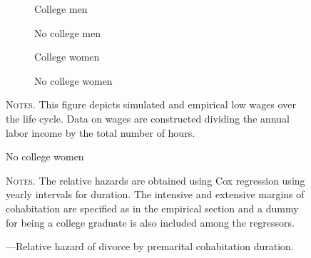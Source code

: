 \documentclass[12pt]{article}
\begin{document}
\begin{figure}[ht]
\begin{center}
\caption{---Low wages over the life cycle: simulations and data}
\label{fig:incomedata}

\begin{subfigure}{.49\textwidth}
\centering
\caption{College men}
\label{fig:em}
\scalebox{0.5}{ } 
\end{subfigure}
\begin{subfigure}{.49\textwidth}
\centering
\caption{No college men}
\label{fig:nm}
\scalebox{0.5}{ } 
\end{subfigure}
\end{center}

\hspace{20em}

\begin{center}
\begin{subfigure}{.49\textwidth}
\centering
\caption{College women}
\label{fig:ef}
\scalebox{0.5}{ } 
\end{subfigure}
\begin{subfigure}{.49\textwidth}
\centering
\caption{No college women}
\label{fig:nf}
\scalebox{0.5}{ } 
\end{subfigure}
\end{center}

\begin{minipage}{0.99\textwidth} %
{\footnotesize \textsc{Notes.} This figure depicts simulated and empirical low wages over the life cycle. Data on wages are constructed dividing the annual labor income by the total number of hours. \par}
\end{minipage}
\end{figure}
\begin{figure}[h!]
	\centering
	\caption{---Relative hazard of divorce by premarital cohabitation duration.}
	\hspace*{-1.3cm} 
	\label{fig:prec}
	\resizebox{0.8\textwidth}{!}{}
	\begin{minipage}{0.99\textwidth} %
		
		\hspace{30em}
		
		{\footnotesize \textsc{Notes.} The relative hazards are obtained using Cox regression using yearly intervals for duration. The intensive and extensive margins of cohabitation are specified as in the empirical section and a dummy for being a college graduate is also included among the regressors. \par}
	\end{minipage}
\end{figure}
\end{document}
